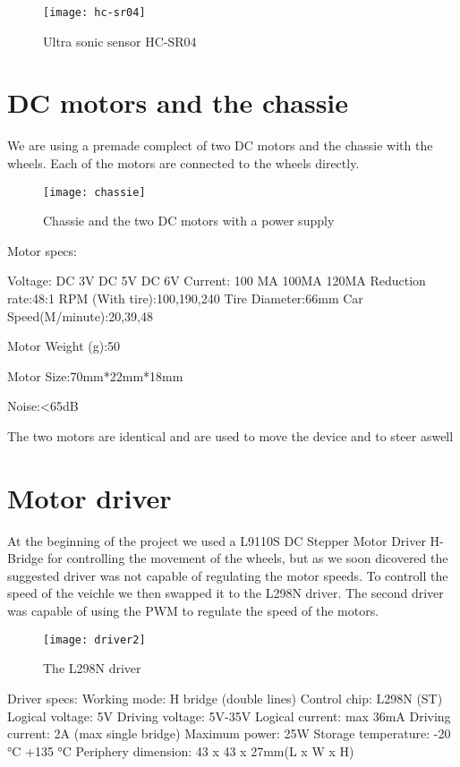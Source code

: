 \begin{figure}[h]
\centering
\texttt{[image: hc-sr04]}
\caption{Ultra sonic sensor HC-SR04}
\label{fig::hcsr04}
\end{figure}

\section{DC motors and the chassie} 

We are using a premade complect of two DC motors and the chassie with the wheels.
Each of the motors are connected to the wheels directly.

\begin{figure}[h]
\centering
\texttt{[image: chassie]}
\caption{Chassie and the two DC motors with a power supply}
\label{fig::chassie}
\end{figure}

Motor specs:

 Voltage:
DC 3V
DC 5V
DC 6V
Current:
100 MA
100MA
120MA
Reduction rate:48:1
RPM (With tire):100,190,240
Tire Diameter:66mm
Car Speed(M/minute):20,39,48

Motor Weight (g):50

Motor Size:70mm*22mm*18mm

Noise:<65dB 

The two motors are identical and are used to move the device and to steer aswell

\section{Motor driver} 

At the beginning of the project we used a L9110S DC Stepper Motor Driver H-Bridge for controlling the movement of the wheels, but as we soon dicovered the suggested driver was not capable of regulating the motor speeds.
To controll the speed of the veichle we then swapped it to the L298N driver.
The second driver was capable of using the PWM to regulate the speed of the motors.

\begin{figure}[h]
\centering
\texttt{[image: driver2]}
\caption{The L298N driver}
\label{fig::driver2}
\end{figure}

Driver specs:
Working mode:	H bridge (double lines)
Control chip:	L298N (ST)
Logical voltage:	5V
Driving voltage:	5V-35V
Logical current:	max 36mA
Driving current:	2A (max single bridge)
Maximum power:	25W
Storage temperature:	-20 °C +135 °C
Periphery dimension:	43 x 43 x 27mm(L x W x H)

